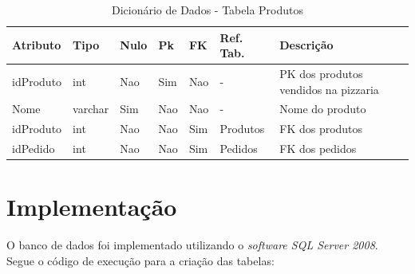 \documentclass[
	12pt,				%
	openright,			%
	oneside,			%
	a4paper,			%
	chapter=TITLE,		%
	section=TITLE,		%
	english,			%
	brazil				%
	]{abntex2}
\begin{document}
    \begin{table}[htbp]
        \caption{Dicionário de Dados - Tabela Produtos}
        \label{tb1_dicionario_dados_produtos}
        \begin{tabular}{|l|l|l|l|l|l|p{3cm}|}
        \hline
            \textbf{Atributo} & 
            \textbf{Tipo} & 
            \textbf{Nulo} & 
            \textbf{Pk} & 
            \textbf{FK} & 
            \textbf{Ref. Tab.} & 
            \textbf{Descrição} \\ \hline
            idProduto & int & Nao & Sim & Nao & - & PK dos produtos vendidos na pizzaria \\ \hline
            Nome & varchar & Sim & Nao & Nao & - & Nome do produto \\ \hline
            idProduto & int & Nao & Nao & Sim & Produtos & FK dos produtos \\ \hline
            idPedido & int & Nao & Nao & Sim & Pedidos & FK dos pedidos \\ \hline
        \end{tabular}
    \end{table}
    
\chapter{Implementação}
    O banco de dados foi implementado utilizando o \textit{software SQL Server 2008}. Segue o código de execução para a criação das tabelas:
    
\end{document}
